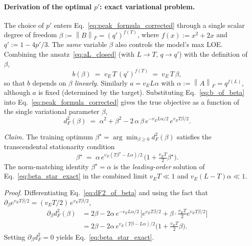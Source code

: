 \documentclass[%
 reprint,
superscriptaddress,
 amsmath,amssymb,
 aps,
]{revtex4-2}
\newcommand{\norm}[1]{\left\lVert#1\right\rVert}
\begin{document}
\paragraph*{Derivation of the optimal $p'$: exact variational problem.}
The choice of $p'$ enters Eq.~\eqref{eq:peak_formula_corrected} through a single scalar degree of freedom $\beta := \norm{B}_F = (q')^{f(T)}$, where $f(x) := x^2+2x$ and $q':= 1-4p'/3$. The \emph{same} variable $\beta$ also controls the model's max LOE. Combining the ansatz~\eqref{eq:aL_closed} (with $L\to T$, $q\to q'$) with the definition of $\beta$,
\begin{equation}
    b(\beta) \;=\; v_E\, T\, (q')^{f(T)} \;=\; v_E\, T\,\beta,
    \label{eq:b_of_beta}
\end{equation}
so that $b$ depends on $\beta$ \emph{linearly}. Similarly $a = v_E L \alpha$ with $\alpha := \norm{A}_F = q^{f(L)}$, although $a$ is fixed (determined by the target). Substituting Eq.~\eqref{eq:b_of_beta} into Eq.~\eqref{eq:peak_formula_corrected} gives the true objective as a function of the single variational parameter $\beta$,
\begin{equation}
    d_F^2(\beta) \;=\; \alpha^2 + \beta^2 - 2\,\alpha\,\beta\,e^{-v_E L\alpha/2}\,e^{v_E T\beta/2}.
    \label{eq:dF2_of_beta}
\end{equation}

\emph{Claim.} The training optimum $\beta^\star = \arg\min_{\beta\ge 0} d_F^2(\beta)$ satisfies the transcendental stationarity condition
\begin{equation}
    \beta^\star \;=\; \alpha\, e^{v_E(T\beta^\star - L\alpha)/2}\,\bigl(1 + \tfrac{v_E T}{2}\beta^\star\bigr).
    \label{eq:beta_star_exact}
\end{equation}
The norm-matching identity $\beta^\star = \alpha$ is the \emph{leading-order} solution of Eq.~\eqref{eq:beta_star_exact} in the combined limit $v_E T \ll 1$ and $v_E(L-T)\alpha \ll 1$.

\emph{Proof.} Differentiating Eq.~\eqref{eq:dF2_of_beta} and using the fact that $\partial_\beta e^{v_E T\beta/2} = (v_E T/2)\,e^{v_E T\beta/2}$,
\begin{equation}
\begin{split}
    \partial_\beta d_F^2(\beta) &= 2\beta - 2\alpha\,e^{-v_E L\alpha/2}\,\bigl[e^{v_E T\beta/2} + \beta\cdot\tfrac{v_E T}{2}e^{v_E T\beta/2}\bigr]\\
    &= 2\beta - 2\alpha\,e^{v_E(T\beta - L\alpha)/2}\bigl(1 + \tfrac{v_E T}{2}\beta\bigr).
\end{split}
\end{equation}
Setting $\partial_\beta d_F^2 = 0$ yields Eq.~\eqref{eq:beta_star_exact}. %
\end{document}
